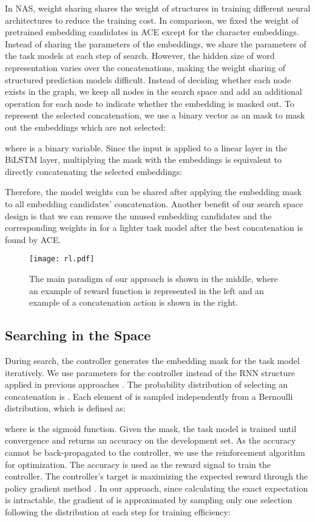 \documentclass{article} \usepackage{iclr2021_conference,times}
\begin{document}
In NAS, weight sharing \citep{pmlr-v80-pham18a} shares the weight of structures in training different neural architectures to reduce the training cost. In comparison, we fixed the weight of pretrained embedding candidates in ACE except for the character embeddings. 
Instead of sharing the parameters of the embeddings, we share the parameters of the task models at each step of search.
However, the hidden size of word representation varies over the concatenations, making the weight sharing of structured prediction models difficult. Instead of deciding whether each node exists in the graph, we keep all nodes in the search space and add an additional operation for each node to indicate whether the embedding is masked out. To represent the selected concatenation, we use a binary vector  as an mask to mask out the embeddings which are not selected:

where  is a binary variable. Since the input  is applied to a linear layer in the BiLSTM layer, multiplying the mask with the embeddings is equivalent to directly concatenating the selected embeddings:

Therefore, the model weights can be shared after applying the embedding mask to all embedding candidates' concatenation. Another benefit of our search space design is that we can remove the unused embedding candidates and the corresponding weights in  for a lighter task model after the best concatenation is found by ACE.

\begin{figure}
	\centering
	\texttt{[image: rl.pdf]}
	\caption{The main paradigm of our approach is shown in the middle, where an example of reward function is represented in the left and an example of a concatenation action is shown in the right.}
	\label{fig:architecture}
\end{figure}


\subsection{Searching in the Space}
During search, the controller generates the embedding mask for the task model iteratively. We use parameters  for the controller instead of the RNN structure applied in previous approaches \citep{zoph2016neural,zoph2018learning}. The probability distribution of selecting an concatenation  is . Each element  of  is
sampled independently from a Bernoulli distribution,
which is defined as:

where  is the sigmoid function.
Given the mask, the task model is trained until convergence and returns an accuracy  on the development set. 
As the accuracy cannot be back-propagated to the controller, we use the reinforcement algorithm for optimization. 
The accuracy  is used as the reward signal to train the controller. 
The controller's target is maximizing the expected reward  through the policy gradient method \citep{williams1992simple}.
In our approach, since calculating the exact expectation is intractable, the gradient of  is approximated by sampling only one selection following the distribution  at each step for training efficiency:
 
\end{document}
